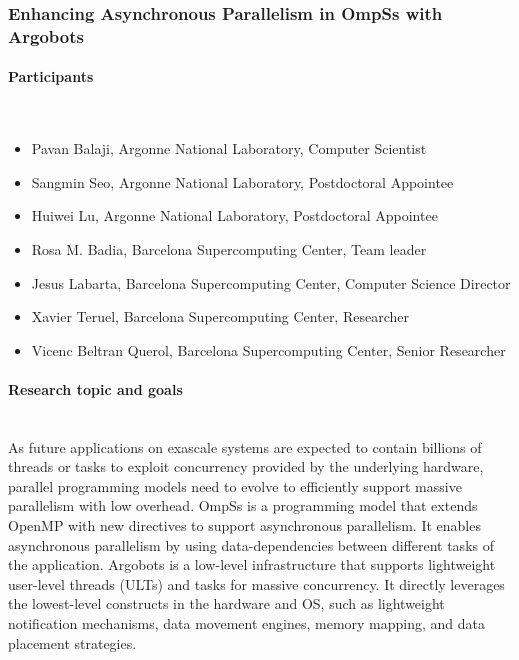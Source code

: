 \subsubsection{Enhancing Asynchronous Parallelism in OmpSs with Argobots}
\label{sec.report.pb} %

\begin{refsection}

\paragraph{Participants}~\\
\begin{itemize}
  \item Pavan Balaji, Argonne National Laboratory, Computer Scientist
  \item Sangmin Seo, Argonne National Laboratory, Postdoctoral Appointee
  \item Huiwei Lu, Argonne National Laboratory, Postdoctoral Appointee
  \item Rosa M. Badia, Barcelona Supercomputing Center, Team leader
  \item Jesus Labarta, Barcelona Supercomputing Center, Computer Science Director
  \item Xavier Teruel, Barcelona Supercomputing Center, Researcher
  \item Vicenc Beltran Querol, Barcelona Supercomputing Center, Senior
Researcher
\end{itemize}

\paragraph{Research topic and goals}~\\

As future applications on exascale systems are expected to contain billions of
threads or tasks to exploit concurrency provided by the underlying hardware,
parallel programming models need to evolve to efficiently support massive
parallelism with low overhead. OmpSs is a programming model that extends OpenMP
with new directives to support asynchronous parallelism. It enables asynchronous
parallelism by using data-dependencies between different tasks of the
application. Argobots is a low-level infrastructure that supports lightweight
user-level threads (ULTs) and tasks for massive concurrency. It directly
leverages the lowest-level constructs in the hardware and OS, such as
lightweight notification mechanisms, data movement engines, memory mapping, and
data placement strategies.


\end{refsection}
